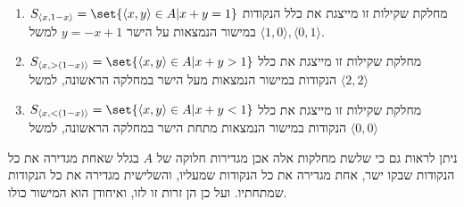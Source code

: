 \documentclass{article}
\DeclarePairedDelimiter\set\{\}
\begin{document}
\begin{enumerate}
	\item $S_{\langle x, 1-x \rangle} = \set{\langle x, y \rangle \in A | x + y = 1}$
	 מחלקת שקילות זו מייצגת את כלל הנקודות במישור הנמצאות על הישר $y = -x + 1$ למשל $\langle 1, 0 \rangle, \langle 0, 1 \rangle$.
	 \item $S_{\langle x, >(1-x) \rangle} = \set{\langle x, y \rangle \in A| x + y > 1}$
	 מחלקת שקילות זו מייצגת את כלל הנקודות במישור הנמצאות מעל הישר במחלקה הראשונה, למשל $\langle 2, 2 \rangle$
	 \item $S_{\langle x, <(1-x) \rangle} = \set{\langle x, y \rangle \in A| x + y < 1}$
	 מחלקת שקילות זו מייצגת את כלל הנקודות במישור הנמצאות מתחת הישר במחלקה הראשונה, למשל $\langle 0, 0 \rangle$
\end{enumerate}
ניתן לראות גם כי שלשת מחלקות אלה אכן מגדירות חלוקה של $A$ בגלל שאחת מגדירה את כל הנקודות שבקו ישר, אחת מגדירה את כל הנקודות שמעליו, והשלישית מגדירה את כל הנקודות שמתחתיו.
ועל כן הן זרות זו לזו, ואיחודן הוא המישור כולו.
\end{document}
